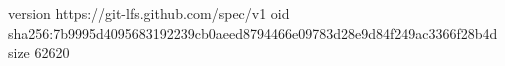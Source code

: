 version https://git-lfs.github.com/spec/v1
oid sha256:7b9995d4095683192239cb0aeed8794466e09783d28e9d84f249ac3366f28b4d
size 62620
